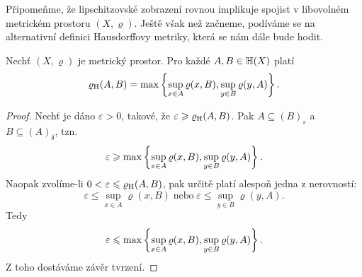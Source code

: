 Připomeňme, že lipschitzovské zobrazení rovnou implikuje spojist v libovolném metrickém prostoru $(X,\varrho)$. Ještě však než začneme, podíváme se na alternativní definici Hausdorffovy metriky, která se nám dále bude hodit.
\begin{theorem}\label{thm:alternativni-hausdorffova-metrika}
    Nechť $(X,\varrho)$ je metrický prostor. Pro každé $A,B\in\mathbb{H}(X)$ platí
    \[\varrho_\textup{H}(A,B)=\max\left\{\sup_{x\in A}\varrho(x,B),\sup_{y\in B}\varrho(y,A)\right\}.\]
\end{theorem}
\begin{proof}
    Nechť je dáno $\varepsilon>0$, takové, že $\varepsilon\geqslant\varrho_\textup{H}(A,B)$. Pak $A\subseteq(B)_\varepsilon$ a $B\subseteq(A)_\delta$, tzn.
    \[\varepsilon\geqslant\max\left\{\sup_{x\in A}\varrho(x,B),\sup_{y\in B}\varrho(y,A)\right\}.\]
    Naopak zvolíme-li $0<\varepsilon\leqslant\varrho_\textup{H}(A,B)$, pak určitě platí alespoň jedna z nerovností:
    \[\varepsilon\leqslant\sup_{x\in A}\varrho(x,B)\;\text{nebo}\;\varepsilon\leqslant\sup_{y\in B}\varrho(y,A).\]
    Tedy
    \[\varepsilon\leqslant\max\left\{\sup_{x\in A}\varrho(x,B),\sup_{y\in B}\varrho(y,A)\right\}.\]
    Z toho dostáváme závěr tvrzení.
\end{proof}

